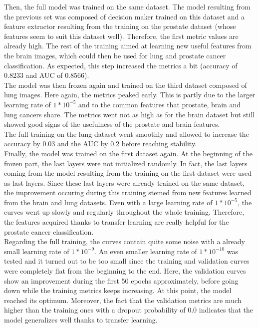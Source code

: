 Then, the full model was trained on the same dataset. The model resulting from the previous set was composed of decision maker trained on this dataset and a feature extractor resulting from the training on the prostate dataset (whose features seem to suit this dataset well). Therefore, the first metric values are already high. The rest of the training aimed at learning new useful features from the brain images, which could then be used for lung and prostate cancer classification. As expected, this step increased the metrics a bit (accuracy of $0.8233$ and AUC of $0.8566$).\\
The model was then frozen again and trained on the third dataset composed of lung images. Here again, the metrics peaked early. This is partly due to the larger learning rate of $1*10^{-5}$ and to the common features that prostate, brain and lung cancers share. The metrics went not as high as for the brain dataset but still showed good signs of the usefulness of the prostate and brain features.\\
The full training on the lung dataset went smoothly and allowed to increase the accuracy by $0.03$ and the AUC by $0.2$ before reaching stability.\\
Finally, the model was trained on the first dataset again. At the beginning of the frozen part, the last layers were not initialized randomly. In fact, the last layers coming from the model resulting from the training on the first dataset were used as last layers. Since these last layers were already trained on the same dataset, the improvement occuring during this training stemed from new features learned from the brain and lung datasets. Even with a large learning rate of $1*10^{-5}$, the curves went up slowly and regularly throughout the whole training. Therefore, the features acquired thanks to transfer learning are really helpful for the prostate cancer classification.\\
Regarding the full training, the curves contain quite some noise with a already small learning rate of $1*10^{-9}$. An even smaller learning rate of $1*10^{-10}$ was tested and it turned out to be too small since the training and validation curves were completely flat from the beginning to the end. Here, the validation curves show an improvement during the first 50 epochs approximately, before going down while the training metrics keeps increasing. At this point, the model reached its optimum. Moreover, the fact that the validation metrics are much higher than the training ones with a dropout probability of 0.0 indicates that the model generalizes well thanks to transfer learning. 


